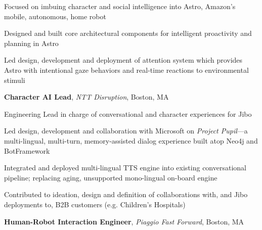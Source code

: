\documentclass[10pt, letter]{article}
\newcommand{\years}[1]{\marginnote{\footnotesize #1}}
\newenvironment{desc*}{
  \begin{description}
    \setlength{\itemsep}{0.2pt}
    \setlength{\parskip}{-1pt}
    \setlength{\parsep}{0pt}
  }{
  \end{description}
}
\begin{document}
Focused on imbuing character and social intelligence into Astro, Amazon's mobile, autonomous, home robot

\begin{itemize}[leftmargin=*, rightmargin=1.5cm]
  {\light
\item Designed and built core architectural components for intelligent proactivity and planning in Astro
\item Led design, development and deployment of attention system which provides Astro with intentional gaze behaviors and real-time reactions to environmental stimuli
  }
\end{itemize}
\bigskip
\years{2020 -- 2022} 
\textbf{Character AI Lead},
\textit{NTT Disruption}, Boston, MA\bigskip

Engineering Lead in charge of conversational and character experiences for Jibo
\begin{itemize}[leftmargin=*, rightmargin=1.5cm]
  {\light
\item Led design, development and collaboration with Microsoft on \textit{Project Pupil}---a
  multi-lingual, multi-turn, memory-assisted dialog experience built atop Neo4j and BotFramework
\item Integrated and deployed multi-lingual TTS engine into existing
  conversational pipeline; replacing aging, unsupported mono-lingual on-board engine
\item Contributed to ideation, design and definition of collaborations with, and Jibo deployments
  to, B2B customers (e.g. Children's Hospitals)
  }
\end{itemize}
\bigskip
\years{2018 -- 2020} 
\textbf{Human-Robot Interaction Engineer},
\textit{Piaggio Fast Forward}, Boston, MA\bigskip
\end{document}

